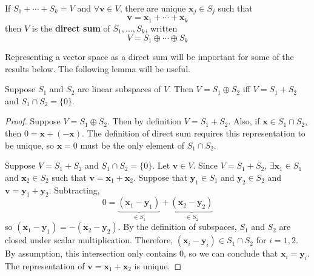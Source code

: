 \begin{definition}
  If $S_1 + \cdots + S_k = V$ and $\forall \mathbf{v} \in V$, there
  are unique $\mathbf{x}_j \in S_j$ such that 
  \[ \mathbf{v} = \mathbf{x}_1 + \cdots  + \mathbf{x}_k \]
  then $V$ is the \textbf{direct sum} of $S_1, ..., S_k$, written 
  \[ V = S_1 \oplus \cdots \oplus S_k \]
\end{definition}
Representing a vector space as a direct sum will be important for some
of the results below. The following lemma will be useful.
\begin{lemma}\label{lem:dirSum}
  Suppose $S_1$ and $S_2$ are linear subspaces of $V$. Then $V = S_1
  \oplus S_2$ iff $V = S_1 + S_2$ and $S_1 \cap S_2 = \{0\}$. 
\end{lemma}
\begin{proof}
  Suppose $V = S_1 \oplus S_2$. Then by definition $V = S_1 +
  S_2$. Also, if $\mathbf{x} \in S_1 \cap S_2$, then $0 = \mathbf{x} + (-\mathbf{x})$. The
  definition of direct sum requires this representation to be unique,
  so $\mathbf{x} = 0$ must be the only element of $S_1 \cap S_2$.

  Suppose $V = S_1 + S_2$ and $S_1 \cap S_2 = \{0\}$. Let $\mathbf{v} \in
  V$. Since $V = S_1 + S_2$, $\exists \mathbf{x}_1 \in S_1$ and $\mathbf{x}_2 \in S_2$
  such that $\mathbf{v} = \mathbf{x}_1 + \mathbf{x}_2$. Suppose that
  $\mathbf{y}_1 \in S_1$ and $\mathbf{y}_2 \in S_2$ and $\mathbf{v} =
  \mathbf{y}_1 + \mathbf{y}_2$. Subtracting, 
  \[ 0 = \underbrace{(\mathbf{x}_1 - \mathbf{y}_1)}_{\in S_1} + \underbrace{(\mathbf{x}_2 -
    \mathbf{y}_2)}_{\in S_2} \]
  so $(\mathbf{x}_1 - \mathbf{y}_1) = -(\mathbf{x}_2 -
  \mathbf{y}_2)$. By the definition of subspaces, $S_1$ and $S_2$ are
  closed under scalar multiplication. Therefore, $(\mathbf{x}_i -
  \mathbf{y}_i) \in S_1 \cap S_2$ for $i = 1, 2$. By assumption, this
  intersection only contains $0$, so we can conclude that
  $\mathbf{x}_i = \mathbf{y}_i$. The representation of $\mathbf{v} =
  \mathbf{x}_1 + \mathbf{x}_2$ is unique.
\end{proof}


